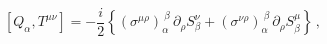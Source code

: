 \begin{equation}
  \left[Q_\alpha,T^{\mu\nu}\right] = -{\textstyle \frac{i}{2}} \left\{
  (\sigma^{\mu\rho})_\alpha^{\ \beta} \, \partial_{\rho} S^{\nu}_\beta +
  (\sigma^{\nu\rho})_\alpha^{\ \beta} \, \partial_{\rho} S^{\mu}_\beta
  \right\} \,,
\end{equation}

